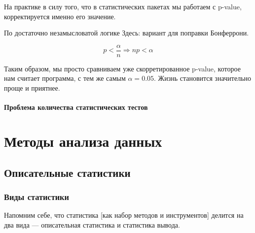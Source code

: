 \documentclass[
  letterpaper,
]{scrbook}
\theoremstyle{definition}
\theoremstyle{remark}
\begin{document}
На практике в силу того, что в статистических пакетах мы работаем с
p-value, корректируется именно его значение.

По достаточно незамысловатой логике Здесь: вариант для поправки
Бонферрони.

\[
p < \frac{\alpha}{n} \Rightarrow np < \alpha
\]

Таким образом, мы просто сравниваем уже скорретированное p-value,
которое нам считает программа, с тем же самым \(\alpha = 0.05\). Жизнь
становится значительно проще и приятнее.

\subsection{Проблема количества статистических
тестов}\label{stats-testing-multiple-testing}

\part{Методы анализа данных}


\chapter{Описательные статистики}\label{andan-descriptives}

\section{Виды статистики}\label{andan-descriptives-kinds-of-stats}

Напомним себе, что статистика {[}как набор методов и инструментов{]}
делится на два вида --- описательная статистика и статистика вывода.
\end{document}
